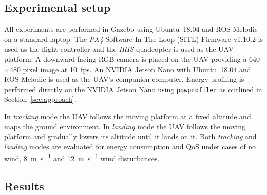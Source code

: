 \documentclass[conference]{IEEEtran}
\newcommand{\stt}[1]{{\small\tt #1}} %
\newcommand{\powprof}{\stt{powprofiler}}
\begin{document}
\subsection{Experimental setup}

All experiments are performed in Gazebo %
using Ubuntu~18.04 and ROS Melodic on a standard
laptop. The \emph{PX4} Software In The Loop (SITL) Firmware v1.10.2 is used as the flight
controller and the \emph{IRIS} quadcopter is used as the UAV platform. A
downward facing RGB camera is placed on the UAV providing a
\SI{640}{}$\times$\SI{480}{} pixel image at 10~fps. An NVIDIA Jetson Nano
with Ubuntu~18.04 and ROS Melodic is used as the UAV's companion
computer. 
%
Energy profiling is performed directly on the NVIDIA Jetson
  Nano using \powprof{} as outlined in Section~\ref{sec:approach}.
  
%
%
In \emph{tracking} mode the UAV follows the moving platform at a fixed
altitude and maps the ground environment.
In \emph{landing} mode the UAV follows the moving platform and
gradually lowers its altitude until it lands on it. Both \emph{tracking} and
\emph{landing} modes are evaluated for energy consumption and QoS under cases of no wind, \SI{8}{\meter \per \second} and \SI{12}{\meter \per \second} wind disturbances. %


\subsection{Results}
\end{document}
